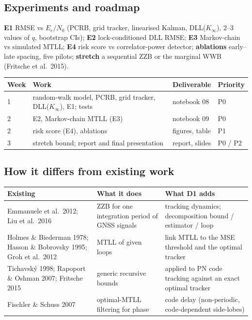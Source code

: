 \documentclass[11pt,a4paper]{article}
\begin{document}
\subsection{Experiments and roadmap}
\textbf{E1} RMSE vs $E_c/N_0$ (PCRB, grid tracker, linearised Kalman, DLL($K_\infty$), 2--3 values of $q$, bootstrap CIs);
\textbf{E2} lock-conditioned DLL RMSE; \textbf{E3} Markov-chain vs simulated MTLL; \textbf{E4} risk score vs correlator-power detector;
\textbf{ablations} early--late spacing, five pilots; \textbf{stretch} a sequential ZZB or the marginal WWB (Fritsche et al.\ 2015).
\begin{center}
\begin{tabularx}{\textwidth}{l>{\raggedright\arraybackslash}X>{\raggedright\arraybackslash}p{3.6cm}l}
\toprule
\textbf{Week} & \textbf{Work} & \textbf{Deliverable} & \textbf{Priority}\\
\midrule
1 & random-walk model, PCRB, grid tracker, DLL($K_\infty$), E1; tests & notebook 08 & P0\\
2 & E2, Markov-chain MTLL (E3) & notebook 09 & P0\\
2 & risk score (E4), ablations & figures, table & P1\\
3 & stretch bound; report and final presentation & report, slides & P0 / P2\\
\bottomrule
\end{tabularx}
\end{center}

\subsection{How it differs from existing work}
\begin{center}
\begin{tabularx}{\textwidth}{>{\raggedright\arraybackslash}p{4.6cm}>{\raggedright\arraybackslash}X>{\raggedright\arraybackslash}X}
\toprule
\textbf{Existing} & \textbf{What it does} & \textbf{What D1 adds}\\
\midrule
Emmanuele et al.\ 2012; Liu et al.\ 2016 & ZZB for one integration period of GNSS signals & tracking dynamics; decomposition bound / estimator / loop\\
Holmes \& Biederman 1978; Hasson \& Bobrovsky 1995; Groh et al.\ 2012 & MTLL of given loops & link MTLL to the MSE threshold and the optimal tracker\\
Tichavský 1998; Rapoport \& Oshman 2007; Fritsche 2015 & generic recursive bounds & applied to PN code tracking against an exact optimal tracker\\
Fischler \& Schuss 2007 & optimal-MTLL filtering for phase & code delay (non-periodic, code-dependent side-lobes)\\
\bottomrule
\end{tabularx}
\end{center}
\end{document}
